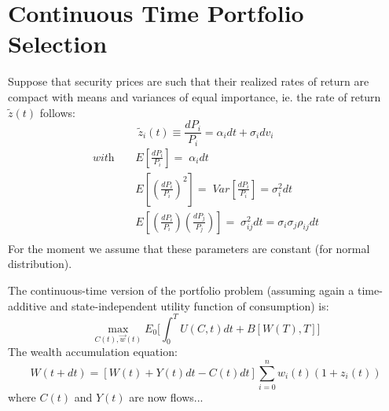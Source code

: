 \documentclass[
14pt,notheorems,hyperref={pdfauthor=whatever}
]{beamer}
\begin{document}
\section{Continuous Time Portfolio Selection}
\begin{frame}
Suppose that security prices are such that their realized rates of return are compact with means and variances of equal importance, ie. the rate of return $\tilde z(t)$ follows:
\begin{equation}
    \tilde z_i(t) \equiv \frac{dP_i}{P_i} = \alpha_i dt + \sigma_i dv_i
\end{equation}
\begin{align*}
    \textit{with}\;\;\;\; &E[\frac{dP_i}{P_i}] =\; \alpha_i dt\\
    &E[(\frac{dP_i}{P_i})^2] =\; Var[\frac{dP_i}{P_i}] = \sigma_i^2 dt\\
    &E[(\frac{dP_i}{P_i})(\frac{dP_j}{P_j})] =\; \sigma_{ij}^2 dt = \sigma_i \sigma_j \rho_{ij} dt\\
\end{align*}
For the moment we assume that these parameters are constant (for normal distribution).\\
\end{frame}

\begin{frame}
The continuous-time version of the portfolio problem (assuming again a time-additive and state-independent utility function of consumption) is:\\
\begin{equation} \tag{2}
    \max_{C(t),\vec{w}(t)} E_0\Bigg[\int_0^T U(C,t)dt + B[W(T),T]\Bigg]
\end{equation}
The wealth accumulation equation:\\
\begin{equation} \tag{3}
    W(t+dt) = [W(t)+Y(t)dt-C(t)dt] \sum_{i=0}^n w_i(t)(1+z_i(t))
\end{equation}
where $C(t)$ and $Y(t)$ are now flows...
\end{frame}
\end{document}
